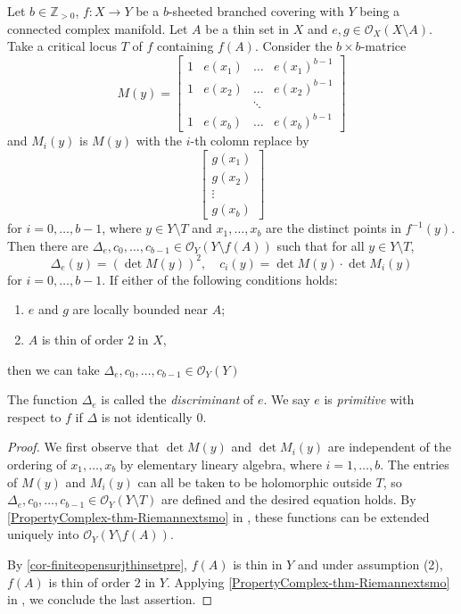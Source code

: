 \begin{proposition}\label{prop-determinanthol}
    Let $b\in \mathbb{Z}_{>0}$, $f:X\rightarrow Y$ be a $b$-sheeted branched covering with $Y$ being a connected complex manifold. Let $A$ be a thin set in $X$ and $e,g\in \mathcal{O}_X(X\setminus A)$. Take a critical locus $T$ of $f$ containing $f(A)$. 
    Consider the $b\times b$-matrice 
    \[
        M(y)=
        \begin{bmatrix}
            1 & e(x_1) & \dots & e(x_1)^{b-1}\\
            1 & e(x_2) & \dots & e(x_2)^{b-1}\\
            &&\ddots &\\
            1 & e(x_b) & \dots & e(x_b)^{b-1}
        \end{bmatrix}    
    \]
    and $M_i(y)$ is $M(y)$ with the $i$-th colomn replace by 
    \[
    \begin{bmatrix}
        g(x_1)\\
        g(x_2)\\
        \vdots\\
        g(x_b)
    \end{bmatrix}    
    \]
     for
     $i=0,\ldots,b-1$, where $y\in Y\setminus T$ and $x_1,\ldots,x_{b}$ are the distinct points in $f^{-1}(y)$. Then there are $\Delta_e,c_0,\ldots,c_{b-1}\in \mathcal{O}_Y(Y\setminus f(A))$ such that for all $y\in Y\setminus T$, 
     \[
        \Delta_e(y)=(\det M(y))^2,\quad c_i(y)=\det M(y)\cdot \det M_i(y) 
     \]
     for $i=0,\ldots,b-1$. If either of the following conditions holds:
     \begin{enumerate}
        \item $e$ and $g$ are locally bounded near $A$;
        \item $A$ is thin of order $2$ in $X$,
     \end{enumerate}
     then we can take $\Delta_e,c_0,\ldots,c_{b-1}\in \mathcal{O}_Y(Y)$
\end{proposition}
The function $\Delta_e$ is called the \emph{discriminant} of $e$. We say $e$ is \emph{primitive} with respect to $f$ if $\Delta$ is not identically $0$.
\begin{proof}
    We first observe that $\det M(y)$ and $\det M_i(y)$ are independent of the ordering of $x_1,\ldots,x_b$ by elementary lineary algebra, where $i=1,\ldots,b$. The entries of $M(y)$ and $M_i(y)$ can all be taken to be holomorphic outside $T$, so $\Delta_e,c_0,\ldots,c_{b-1}\in \mathcal{O}_Y(Y\setminus T)$ are defined and the desired equation holds. By \cref{PropertyComplex-thm-Riemannextsmo} in , these functions can be extended uniquely into $\mathcal{O}_Y(Y\setminus f(A))$. 

    By \cref{cor-finiteopensurjthinsetpre}, $f(A)$ is thin in $Y$ and under assumption (2), $f(A)$ is thin of order $2$ in $Y$. Applying \cref{PropertyComplex-thm-Riemannextsmo} in , we conclude the last assertion.
\end{proof}


